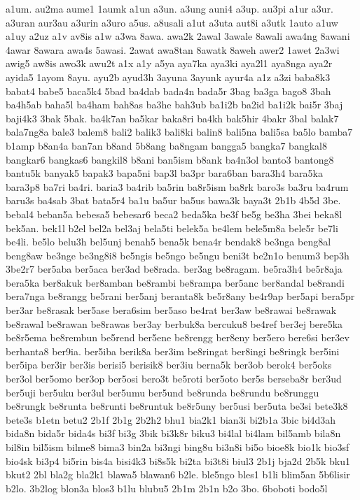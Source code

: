 {a1um. au2ma aume1 1aumk a1un a3un. a3ung auni4 a3up. au3pi a1ur a3ur.
a3uran aur3au a3urin a3uro a5us. a8usali a1ut a3uta aut8i a3utk 1auto a1uw
a1uy a2uz a1v av8is a1w a3wa 8awa. awa2k 2awal 3awale 8awali awa4ng 8awani
4awar 8awara awa4s 5awasi. 2awat awa8tan 8awatk 8aweh awer2 1awet 2a3wi
awig5 aw8is awo3k awu2t a1x a1y a5ya aya7ka aya3ki aya2l1 aya8nga aya2r
ayida5 1ayom 8ayu. ayu2b ayud3h 3ayuna 3ayunk ayur4a a1z a3zi baba8k3
babat4 babe5 baca5k4 5bad ba4dab bada4n bada5r 3bag ba3ga bago8 3bah
ba4h5ab baha5l ba4ham bah8as ba3he bah3ub ba1i2b ba2id ba1i2k bai5r 3baj
baji4k3 3bak 5bak. ba4k7an ba5kar baka8ri ba4kh bak5hir 4bakr 3bal balak7
bala7ng8a bale3 balem8 bali2 balik3 bali8ki balin8 bali5na bali5sa ba5lo
bamba7 b1amp b8an4a ban7an b8and 5b8ang ba8ngam bangga5 bangka7 bangkal8
bangkar6 bangkas6 bangkil8 b8ani ban5ism b8ank ba4n3ol banto3 bantong8
bantu5k banyak5 bapak3 bapa5ni bap3l ba3pr bara6ban bara3h4 bara5ka
bara3p8 ba7ri ba4ri. baria3 ba4rib ba5rin ba8r5ism ba8rk baro3s ba3ru
ba4rum baru3s ba4sab 3bat bata5r4 ba1u ba5ur ba5us bawa3k baya3t 2b1b 4b5d
3be. bebal4 beban5a bebesa5 bebesar6 beca2 beda5ka be3f be5g be3ha 3bei
beka8l bek5an. bek1l b2el bel2a bel3aj bela5ti belek5a be4lem bele5m8a
bele5r be7li be4li. be5lo belu3h bel5unj benah5 bena5k bena4r bendak8
be3nga beng8al beng8aw be3nge be3ng8i8 be5ngis be5ngo be5ngu beni3t be2n1o
benum3 bep3h 3be2r7 ber5aba ber5aca ber3ad be8rada. ber3ag be8ragam.
be5ra3h4 be5r8aja bera5ka ber8akuk ber8amban be8rambi be8rampa ber5anc
ber8andal be8randi bera7nga be8rangg be5rani ber5anj beranta8k be5r8any
be4r9ap ber5api bera5pr ber3ar be8rasak ber5ase bera6sim ber5aso be4rat
ber3aw be8rawai be8rawak be8rawal be8rawan be8rawas ber3ay berbuk8a
bercuku8 be4ref ber3ej bere5ka be8r5ema be8rembun be5rend ber5ene be8rengg
ber8eny ber5ero bere6si ber3ev berhanta8 ber9ia. ber5iba berik8a ber3im
be8ringat ber8ingi be8ringk ber5ini ber5ipa ber3ir ber3is berisi5 berisik8
ber3iu berna5k ber3ob berok4 ber5oks ber3ol ber5omo ber3op ber5osi bero3t
be5roti ber5oto ber5s berseba8r ber3ud ber5uji ber5uku ber3ul ber5umu
ber5und be8runda be8rundu be8runggu be8rungk be8runta be8runti be8runtuk
be8r5uny ber5usi ber5uta be3si bete3k8 bete3s b1etn betu2 2b1f 2b1g 2b2h2
bhu1 bia2k1 bian3i bi2b1a 3bic bi4d3ah bida8n bida5r bida4s bi3f bi3g 3bik
bi3k8r biku3 bi4lal bi4lam bil5amb bila8n bil8in bil5ism bilme8 bima3
bin2a bi3ngi bing8u bi3n8i bi5o bioe8k bio1k bio3sf bio4sk bi3p4 bi5rin
bis4a bisi4k3 bi8s5k bi2ta bi3t8i biul3 2b1j bja2d 2b5k bku1 bkut2 2bl
bla2g bla2k1 blawa5 blawan6 b2le. ble5ngo bles1 b1li blim5an 5b6lisir
b2lo. 3b2log blon3a blos3 b1lu blubu5 2b1m 2b1n b2o 3bo. 6boboti bodo5l
}
